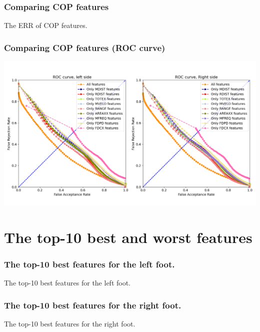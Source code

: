 \documentclass{beamer}
\begin{document}
\begin{frame}
\frametitle{Comparing COP features}
\tiny
\begin{table}
\centering
\captionsetup{labelformat=empty}
\caption{\small The ERR of COP features.}
\label{tab:parameters condition}

\end{table}
\end{frame}


\begin{frame}
\centering
\frametitle{Comparing COP features (ROC curve)}
\includegraphics[scale=0.3]{Manuscripts/src/figures/feat.png}
\end{frame}




\section{The top-10 best and worst features}

\begin{frame}[shrink=10]
\frametitle{The top-10 best features for the left foot.}
\tiny
\begin{table}
\centering
\caption{\small The top-10 best features for the left foot.}

\end{table}
\end{frame}

\begin{frame}[shrink=10]
\frametitle{The top-10 best features for the right foot.}
\tiny
\begin{table}
\centering
\caption{\small The top-10 best features for the right foot.}

\end{table}
\end{frame}
\end{document}
